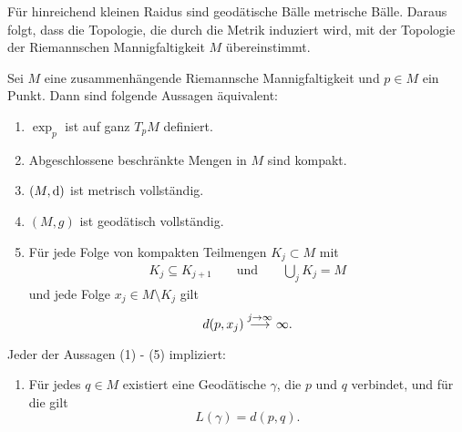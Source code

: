 Für hinreichend kleinen Raidus sind geodätische Bälle metrische Bälle. Daraus folgt, dass die Topologie, die durch die Metrik induziert wird, mit der Topologie der Riemannschen Mannigfaltigkeit $M$ übereinstimmt.

Sei $M$ eine zusammenhängende Riemannsche Mannigfaltigkeit und $p\in M$ ein Punkt. Dann sind folgende Aussagen äquivalent:
\begin{enumerate}[(1)]
	\item $\exp_p$ ist auf ganz $T_pM$ definiert.
	\item Abgeschlossene beschränkte Mengen in $M$ sind kompakt.
	\item $(M,\text{d})$ ist metrisch vollständig.
	\item $(M,g)$ ist geodätisch vollständig.
	\item Für jede Folge von kompakten Teilmengen $K_j \subset M$ mit
	\begin{align*}
	K_j \subseteq K_{j+1} && \text{ und } && \bigcup_j K_j = M
	\end{align*}
	und jede Folge $x_j \in M \setminus K_j$ gilt
	\[ d(p,x_j) \overset{j\overset{}{\rightarrow}\infty}{\longrightarrow} \infty. \]
\end{enumerate}
Jeder der Aussagen (1) - (5) impliziert:
\begin{enumerate}[(6)]
	\item Für jedes $q \in M$ existiert eine Geodätische $\gamma$, die $p$ und $q$ verbindet, und für die gilt
	\[ L(\gamma) = d(p,q). \]
\end{enumerate}
